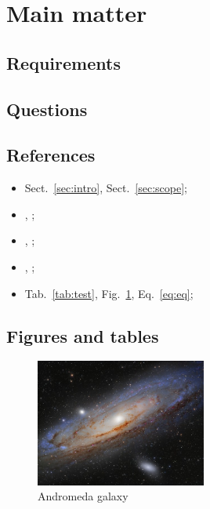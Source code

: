 \section{Main matter}

\subsection{Requirements}

\lipsum[1]


\lipsum[2]


\subsection{Questions}

\lipsum[3]


\lipsum[4]



\subsection{References}

\lipsum[5]

\begin{itemize}
\item Sect.~\ref{sec:intro}, Sect.~\ref{sec:scope};
\item {}, ;
\item {}, ;
\item {}, ;
\item Tab.~\ref{tab:test}, Fig.~\ref{fig:m31}, Eq.~\ref{eq:eq};
\end{itemize}


\subsection{Figures and tables}

\lipsum[6]

\begin{figure}[hbtp!]
  \centering
  \includegraphics[width=0.5\textwidth]{media/m31}
  \caption{Andromeda galaxy}
    \label{fig:m31}
\end{figure}


